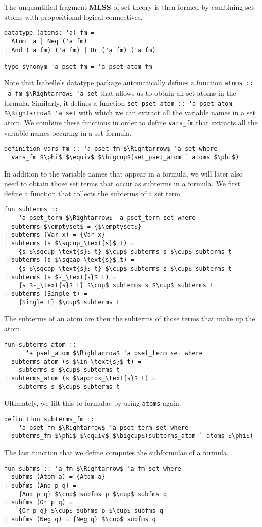\documentclass[sigplan,10pt,anonymous,review]{acmart}
\begin{document}
The unquantified fragment \textbf{MLSS} of set theory is then formed by combining set atoms with propositional logical connectives.
\begin{lstlisting}
datatype (atoms: 'a) fm =
  Atom 'a | Neg ('a fm)
| And ('a fm) ('a fm) | Or ('a fm) ('a fm)

type_synonym 'a pset_fm = 'a pset_atom fm
\end{lstlisting}
Note that Isabelle's datatype package automatically defines a function \lstinline!atoms :: 'a fm $\Rightarrow$ 'a set! that allows us to obtain all set atoms in the formula.
Similarly, it defines a function \lstinline!set_pset_atom :: 'a pset_atom $\Rightarrow$ 'a set! with which we can extract all the variable names in a set atom.
We combine these functions in order to define \lstinline!vars_fm! that extracts all the variable names occuring in a set formula.
\begin{lstlisting}
definition vars_fm :: 'a pset_fm $\Rightarrow$ 'a set where
  vars_fm $\phi$ $\equiv$ $\bigcup$(set_pset_atom ` atoms $\phi$)
\end{lstlisting}
In addition to the variable names that appear in a formula, we will later also need to obtain those set terms that occur as subterms in a formula. 
We first define a function that collects the subterms of a set term.
\begin{lstlisting}
fun subterms ::
    'a pset_term $\Rightarrow$ 'a pset_term set where
  subterms $\emptyset$ = {$\emptyset$}
| subterms (Var x) = {Var x}
| subterms (s $\sqcup_\text{s}$ t) =
    {s $\sqcup_\text{s}$ t} $\cup$ subterms s $\cup$ subterms t
| subterms (s $\sqcap_\text{s}$ t) =
    {s $\sqcap_\text{s}$ t} $\cup$ subterms s $\cup$ subterms t
| subterms (s $-_\text{s}$ t) =
    {s $-_\text{s}$ t} $\cup$ subterms s $\cup$ subterms t
| subterms (Single t) =
    {Single t} $\cup$ subterms t
\end{lstlisting}
The subterms of an atom are then the subterms of those terms that make up the atom.
\begin{lstlisting}
fun subterms_atom ::
      'a pset_atom $\Rightarrow$ 'a pset_term set where
  subterms_atom (s $\in_\text{s}$ t) =
    subterms s $\cup$ subterms t
| subterms_atom (s $\approx_\text{s}$ t) =
    subterms s $\cup$ subterms t
\end{lstlisting}
Ultimately, we lift this to formulae by using \lstinline!atoms! again.
\begin{lstlisting}
definition subterms_fm ::
    'a pset_fm $\Rightarrow$ 'a pset_term set where
  subterms_fm $\phi$ $\equiv$ $\bigcup$(subterms_atom ` atoms $\phi$)
\end{lstlisting}
The last function that we define computes the subformulae of a formula.
\begin{lstlisting}
fun subfms :: 'a fm $\Rightarrow$ 'a fm set where
  subfms (Atom a) = {Atom a}
| subfms (And p q) =
    {And p q} $\cup$ subfms p $\cup$ subfms q
| subfms (Or p q) =
    {Or p q} $\cup$ subfms p $\cup$ subfms q
| subfms (Neg q) = {Neg q} $\cup$ subfms q
\end{lstlisting}
\end{document}
